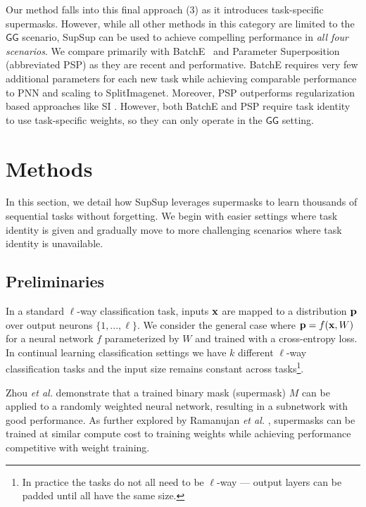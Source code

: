 \documentclass{article}
\newcommand{\ac}{SupSup\xspace}
\newcommand{\casename}[1]{\ensuremath{\mathsf{#1}}\xspace}
\begin{document}
Our method falls into this final approach (3) as it introduces task-specific supermasks.
However, while all other methods in this category are limited to the \casename{GG} scenario, SupSup can be used to achieve compelling performance in \emph{all four scenarios}.
We compare primarily with BatchE~\cite{wen2020batchensemble} and Parameter Superposition (abbreviated PSP) \cite{cheung2019superposition} as they are recent and performative. BatchE requires very few additional parameters for each new task while achieving comparable performance to PNN and scaling to SplitImagenet. Moreover, PSP outperforms regularization based approaches like SI \cite{zenke2017continual}.
However, both BatchE \cite{wen2020batchensemble} and PSP \cite{cheung2019superposition} require task identity to use task-specific weights, so they can only operate in the \casename{GG} setting.

\vspace*{-1ex}
\section{Methods} \label{sec:method}
\vspace*{-1ex}

In this section, we detail how \ac leverages supermasks to learn thousands of sequential tasks without forgetting. We begin with easier settings where task identity is given and gradually move to more challenging scenarios where task identity is unavailable.

\subsection{Preliminaries}

In a standard $\ell$-way classification task, inputs $\mathbf{x}$ are mapped to a distribution $\mathbf{p}$ over output neurons $\{1,...,\ell\}$. 
We consider the general case where $\mathbf{p} = f(\mathbf{x}, W)$ for a neural network $f$ parameterized by $W$ and trained with a cross-entropy loss. In continual learning classification settings we have $k$ different $\ell$-way classification tasks and the input size remains constant across tasks\footnote{In practice the tasks do not all need to be $\ell$-way --- output layers can be padded until all have the same size.}.

Zhou \textit{et al.} \cite{zhou2019deconstructing} demonstrate that a trained binary mask (supermask) $M$ can be applied to a randomly weighted neural network, resulting in a subnetwork with good performance. As further explored by Ramanujan \textit{et al.} \cite{ramanujan2019s}, supermasks can be trained at similar compute cost to training weights while achieving performance competitive with weight training.
\end{document}

